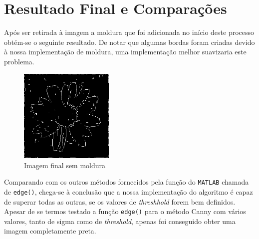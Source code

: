 \documentclass[a4paper]{report}
\begin{document}
\section{Resultado Final e Comparações}

Após ser retirada à imagem a moldura que foi adicionada no início deste processo obtém-se o seguinte resultado. De notar que algumas bordas foram criadas devido à nossa implementação de moldura, uma implementação melhor suavizaria este problema.

\begin{figure}[H]
    \centering
        \includegraphics[width=0.4\textwidth]{images/Canny/flowerFinal.png}
        \caption{Imagem final sem moldura}
\end{figure}


Comparando com os outros métodos fornecidos pela função do \texttt{MATLAB} chamada de \texttt{edge()}, chega-se à conclusão que a nossa implementação do algoritmo é capaz de superar todas as outras, se os valores de \textit{threshhold} forem bem definidos. Apesar de se termos testado a função \texttt{edge()} para o método Canny com vários valores, tanto de sigma como de \textit{threshold}, apenas foi conseguido obter uma imagem completamente preta.
\end{document}
